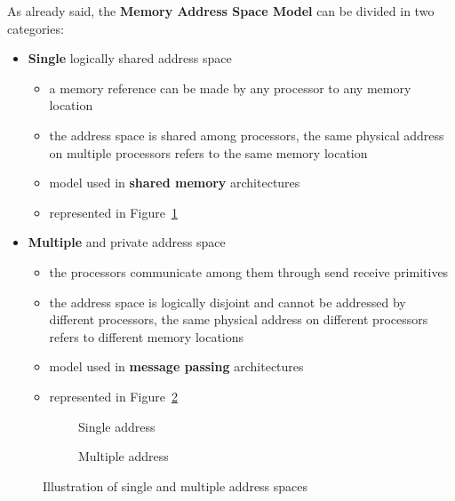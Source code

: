 \documentclass[english]{article}
\begin{document}
\bigskip
As already said, the \textbf{Memory Address Space Model} can be divided in two categories:

\begin{itemize}
  \item \textbf{Single} logically shared address space
        \begin{itemize}
          \item a memory reference can be made by any processor to any memory location
          \item the address space is shared among processors, the same physical address on multiple processors refers to the same memory location
          \item model used in \textbf{shared memory} architectures
          \item represented in Figure~\ref{subfig:single-address-space}
        \end{itemize}
  \item \textbf{Multiple} and private address space
        \begin{itemize}
          \item the processors communicate among them through send receive primitives
          \item the address space is logically disjoint and cannot be addressed by different processors, the same physical address on different processors refers to different memory locations
          \item model used in \textbf{message passing} architectures
          \item represented in Figure~\ref{subfig:multiple-address-space}
        \end{itemize}
\end{itemize}

\begin{figure}[htbp]
  \bigskip
  \centering
  \begin{subfigure}[b]{0.495\textwidth}
    \centering
    \caption{Single address}
    \label{subfig:single-address-space}
  \end{subfigure}
  \begin{subfigure}[b]{0.495\textwidth}
    \centering
    \caption{Multiple address}
    \label{subfig:multiple-address-space}
  \end{subfigure}
  \caption{Illustration of single and multiple address spaces}
  \label{fig:address-spaces}
  \bigskip
\end{figure}
\end{document}
